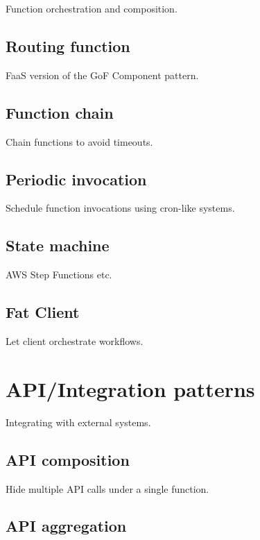 Function orchestration and composition.

\subsection{Routing function} \label{subsubsec:routingFunction}

FaaS version of the GoF Component pattern.

\subsection{Function chain} \label{subsubsec:functionChain}

Chain functions to avoid timeouts.

\subsection{Periodic invocation} \label{subsubsec:periodicInvocation}

Schedule function invocations using cron-like systems.

\subsection{State machine} \label{subsubsec:stateMachine}

AWS Step Functions etc.

\subsection{Fat Client} \label{subsubsec:fatClient}

Let client orchestrate workflows.


\section{API/Integration patterns} \label{sec:apiPatterns}

Integrating with external systems.

\subsection{API composition} \label{subsubsec:apiComposition}

Hide multiple API calls under a single function.

\subsection{API aggregation} \label{subsubsec:apiAggregation}

